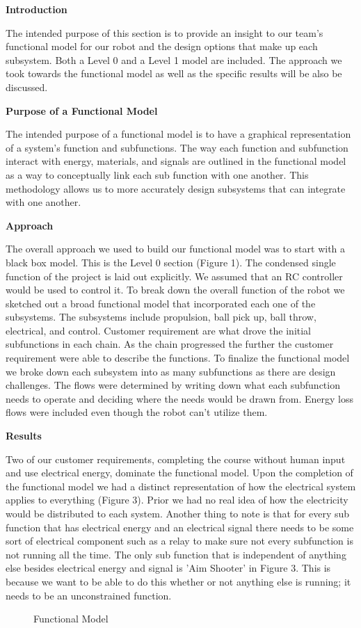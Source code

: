 \documentclass[12pt,letterpaper,titlepage]{article}
\begin{document}
\smallskip\noindent\textbf{Introduction}

The intended purpose of this section is to provide an insight to our team's functional model for our robot and the design options that make up each subsystem. Both a Level 0 and a Level 1 model are included. The approach we took towards the functional model as well as the specific results will be also be discussed. 

\smallskip\noindent\textbf{Purpose of a Functional Model}

The intended purpose of a functional model is to have a graphical representation of a system’s function and subfunctions. The way each function and subfunction interact with energy, materials, and signals are outlined in the functional model as a way to conceptually link each sub function with one another. This methodology allows us to more accurately design subsystems that can integrate with one another. 

\smallskip\noindent\textbf{Approach}

The overall approach we used to build our functional model was to start with a black box model. This is the Level 0 section (Figure 1). The condensed single function of the project is laid out explicitly. We assumed that an RC controller would be used to control it. To break down the overall function of the robot we sketched out a broad functional model that incorporated each one of the subsystems. The subsystems include propulsion, ball pick up, ball throw, electrical, and control. Customer requirement are what drove the initial subfunctions in each chain. As the chain progressed the further the customer requirement were able to describe the functions. To finalize the functional model we broke down each subsystem into as many subfunctions as there are design challenges. The flows were determined by writing down what each subfunction needs to operate and deciding where the needs would be drawn from. Energy loss flows were included even though the robot can't utilize them.

\smallskip\noindent\textbf{Results}

Two of our customer requirements, completing the course without human input and use electrical energy, dominate the functional model. Upon the completion of the functional model we had a distinct representation of how the electrical system applies to everything (Figure 3). Prior we had no real idea of how the electricity would be distributed to each system. Another thing to note is that for every sub function that has electrical energy and an electrical signal there needs to be some sort of electrical component such as a relay to make sure not every subfunction is not running all the time. The only sub function  that is independent of anything else besides electrical energy and signal is 'Aim Shooter'  in Figure 3. This is because we want to be able to do this whether or not anything else is running; it needs to be an unconstrained function.
\begin{figure}[H]
	\centering
	\label{fig:Func}
	\caption{Functional Model}
\end{figure}
\end{document}
